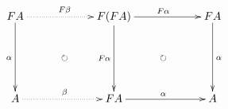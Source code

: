 \documentclass[12pt]{article}
\begin{document}
\pagestyle{empty}

\begin{align*}
  \vcenter{
    \xymatrix@=60pt{
      F A
      \ar@{->}[d]_{\alpha}
      \ar@{.>}[r]^{F \beta}
      \ar@{{}{ }{}}[rd]|{\circlearrowright}
      &
      F (F A)
      \ar@{->}[d]_{F \alpha}
      \ar@{->}[r]^{F \alpha}
      \ar@{{}{ }{}}[rd]|{\circlearrowright}
      &
      F A
      \ar@{->}[d]^{\alpha}
      \\
      A
      \ar@{.>}[r]^{\beta}
      &
      F A
      \ar@{->}[r]^{\alpha}
      &
      A
    }
  }
\end{align*}
\end{document}
